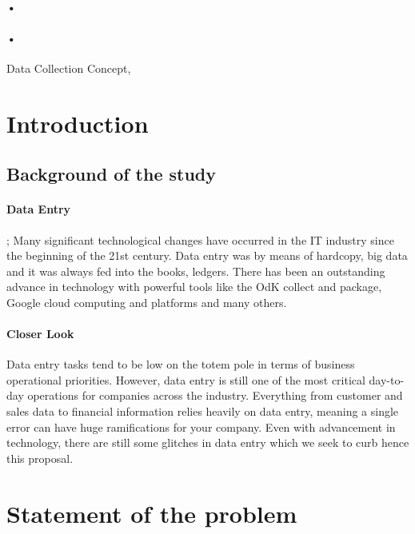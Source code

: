 \documentclass[12pt,]{article}
\begin{document}
\begin{titlepage}
\paragraph*{•}
\paragraph*{•}
  \begin{flushright}
  Data Collection Concept,\\
 
 \tableofcontents

  \end{flushright}
\date{\today}
\end{titlepage}

\newpage



\section{
\textbf{Introduction}}
\subsection*{Background of the study}
\paragraph{Data Entry}
; Many significant technological changes have occurred in the IT industry since the beginning of the 21st century. Data entry was by means of hardcopy, big data and it was always fed into the books, ledgers. There has been an outstanding advance in technology with powerful tools like the OdK collect and package, Google cloud computing and platforms and many others.

\paragraph{Closer Look}
Data entry tasks tend to be low on the totem pole in terms of business operational priorities. However, data entry is still one of the most critical day-to-day operations for companies across the industry. Everything from customer and sales data to financial information relies heavily on data entry, meaning a single error can have huge ramifications for your company.
 Even with advancement in technology, there are still some glitches in data entry which we seek to curb hence this proposal.

\section{
\textbf{Statement of the problem}}
\end{document}
